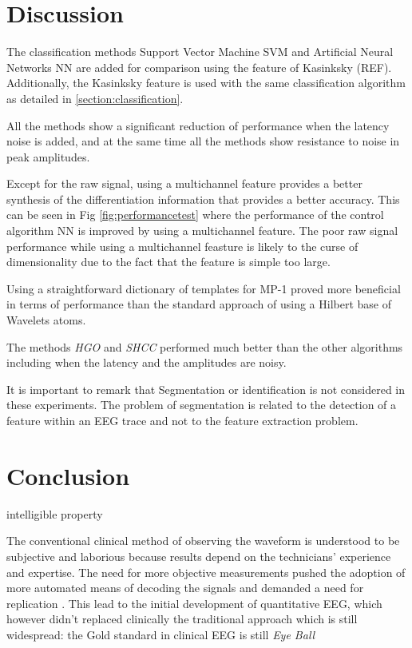 \documentclass[brainsci,article,submit,moreauthors,pdftex,10pt,a4paper]{mdpi}
\begin{document}
\section{Discussion}
\label{section:discussion}

The classification methods Support Vector Machine SVM and Artificial Neural Networks NN are added for comparison using the feature of Kasinksky (REF).  Additionally, the Kasinksky feature is used with the same classification algorithm as detailed in \ref{section:classification}.

All the methods show a significant reduction of performance when the latency noise is added, and at the same time all the methods show resistance to noise in peak amplitudes.

Except for the raw signal, using a multichannel feature provides a better synthesis of the differentiation information that provides a better accuracy.  This can be seen in Fig \ref{fig:performancetest} where the performance of the control algorithm NN is improved by using a multichannel feature.  The poor raw signal performance while using a multichannel feasture is likely to the curse of dimensionality due to the fact that the feature is simple too large.

Using a straightforward dictionary of templates for MP-1 proved more beneficial in terms of performance than the standard approach of using a Hilbert base of Wavelets atoms.

The methods \textit{HGO} and \textit{SHCC} performed much better than the other algorithms including when the latency and the amplitudes are noisy.

It is important to remark that Segmentation or identification is not considered in these experiments. The  problem of segmentation is related to the detection of a feature within an EEG trace and not to the feature extraction problem.

\section{Conclusion}
\label{section:conclusion}

intelligible property

The conventional clinical method of observing the waveform is understood to be subjective and laborious because results depend on the technicians' experience and expertise.  The need for more objective measurements pushed the adoption of more automated means of decoding the signals and demanded a need for replication \citep{Thakor2004}.  This lead to the initial development of quantitative EEG, which however didn't replaced clinically the traditional approach which is still widespread: the Gold standard in clinical EEG is still \textit{Eye Ball}
\end{document}
